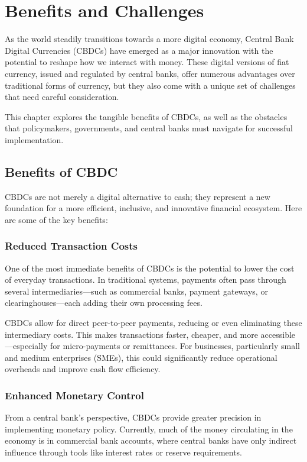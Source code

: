 %
    \chapter{Benefits and Challenges}
\label{chp6}

As the world steadily transitions towards a more digital economy, Central Bank Digital Currencies (CBDCs) have emerged as a major innovation with the potential to reshape how we interact with money. These digital versions of fiat currency, issued and regulated by central banks, offer numerous advantages over traditional forms of currency, but they also come with a unique set of challenges that need careful consideration.

This chapter explores the tangible benefits of CBDCs, as well as the obstacles that policymakers, governments, and central banks must navigate for successful implementation.

\section{Benefits of CBDC}
CBDCs are not merely a digital alternative to cash; they represent a new foundation for a more efficient, inclusive, and innovative financial ecosystem. Here are some of the key benefits:

\subsection{Reduced Transaction Costs}
One of the most immediate benefits of CBDCs is the potential to lower the cost of everyday transactions. In traditional systems, payments often pass through several intermediaries—such as commercial banks, payment gateways, or clearinghouses—each adding their own processing fees.

CBDCs allow for direct peer-to-peer payments, reducing or even eliminating these intermediary costs. This makes transactions faster, cheaper, and more accessible—especially for micro-payments or remittances. For businesses, particularly small and medium enterprises (SMEs), this could significantly reduce operational overheads and improve cash flow efficiency.

\subsection{Enhanced Monetary Control}
From a central bank’s perspective, CBDCs provide greater precision in implementing monetary policy. Currently, much of the money circulating in the economy is in commercial bank accounts, where central banks have only indirect influence through tools like interest rates or reserve requirements.

